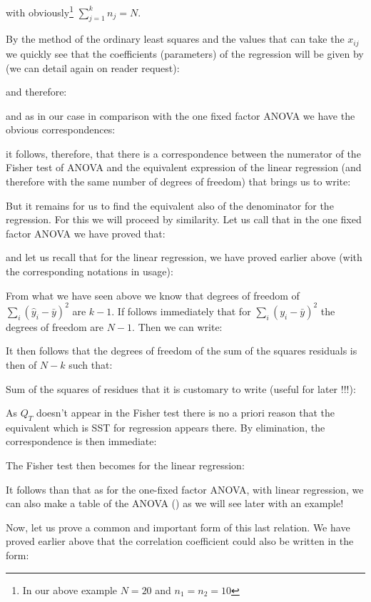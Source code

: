 	with obviously\footnote{In our above example $N=20$ and $n_1=n_2=10$} $\sum_{j=1}^k n_j=N$.

	By the method of the ordinary least squares and the values that can take the $x_{ij}$ we quickly see that the coefficients (parameters) of the regression will be given by (we can detail again on reader request):
	
	and therefore:
	
	and as in our case in comparison with the one fixed factor ANOVA we have the obvious correspondences:
	
	it follows, therefore, that there is a correspondence between the numerator of the Fisher test of ANOVA and the equivalent expression of the linear regression (and therefore with the same number of degrees of freedom) that brings us to write:
	
	But it remains for us to find the equivalent also of the denominator for the regression. For this we will proceed by similarity. Let us call that in the one fixed factor ANOVA we have proved that:
	
	and let us recall that for the linear regression, we have proved earlier above (with the corresponding notations in usage):
	
	From what we have seen above we know that degrees of freedom of $\sum_i (\hat{y}_i-\bar{y})^2$ are $k-1$. If follows immediately that for $\sum_i (y_{i}-\bar{y})^2$ the degrees of freedom are $N-1$. Then we can write:
	
	It then follows that the degrees of freedom of the sum of the squares residuals is then of $N-k$ such that:
	
	Sum of the squares of residues that it is customary to write (useful for later !!!):
	
	As $Q_T$ doesn't appear in the Fisher test there is no a priori reason that the equivalent which is SST for regression appears there. By elimination, the correspondence is then immediate:
	
	The Fisher test then becomes for the linear regression:
	
	It follows than that as for the one-fixed factor ANOVA, with linear regression, we can also make a table of the ANOVA () as we will see later with an example!
	
	Now, let us prove a common and important form of this last relation. We have proved earlier above that the correlation coefficient could also be written in the form:
	
